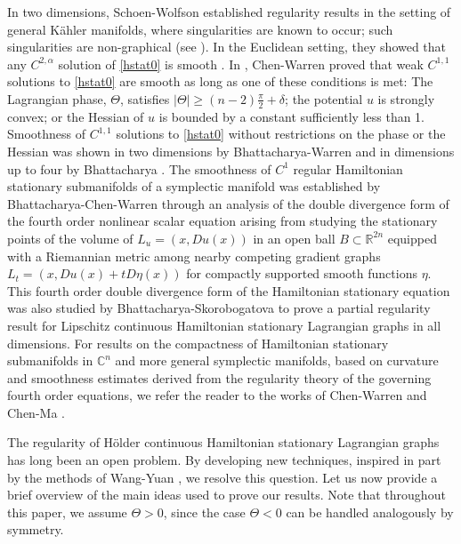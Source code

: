 \documentclass[12pt,reqno]{amsart}%
\theoremstyle{plain}
\numberwithin{equation}{section}
\theoremstyle{definition}
\theoremstyle{remark}
\begin{document}
In two dimensions, Schoen-Wolfson \cite{SW03} established regularity results in the setting of general Kähler manifolds, where singularities are known to occur; such singularities are non-graphical (see \cite[Section 7]{SWJDG}).
 In the Euclidean setting, they showed that any $C^{2,\alpha}$ solution of \eqref{hstat0} is smooth \cite[Proposition 4.6]{SWJDG}. In \cite{ChenWarren}, Chen-Warren proved that weak  $C^{1,1}$ solutions
to  \eqref{hstat0} are smooth as long as one of these conditions is met: The Lagrangian phase, $\Theta$, satisfies $|\Theta|\geq (n-2)\frac{\pi}{2}+\delta$; the potential $u$ is strongly convex; or the Hessian of $u$ is bounded by a constant sufficiently less than 1. Smoothness of $C^{1,1}$ solutions to \eqref{hstat0} without restrictions on the phase or the Hessian was shown in two dimensions by Bhattacharya-Warren \cite{BW2} and in dimensions up to four by Bhattacharya \cite{AB2025}. The smoothness of $C^1$ regular Hamiltonian stationary submanifolds of a symplectic manifold was established by Bhattacharya-Chen-Warren \cite{BCW} through an analysis of the double divergence form of the fourth order nonlinear scalar equation arising from studying the stationary points of
the volume of $L_u=(x,Du(x))$ in an open ball $B\subset\mathbb{R}^{2n}$ equipped
with a Riemannian metric among nearby competing gradient graphs $L_{t}=(x, Du(x)
+t D\eta(x))$ for compactly supported smooth functions $\eta$. This fourth order double divergence form of the Hamiltonian stationary equation was also studied by Bhattacharya-Skorobogatova \cite{BhaSko} to prove a partial regularity result for Lipschitz continuous Hamiltonian stationary Lagrangian graphs in all dimensions. For results on the compactness of Hamiltonian stationary submanifolds in $\mathbb{C}^n$ and more general symplectic manifolds, based on curvature and smoothness estimates derived from the regularity theory of the governing fourth order equations, we refer the reader to the works of Chen-Warren \cite{chen2024compactification} and Chen-Ma \cite{chen2024compactness}.

\medskip
The regularity of Hölder continuous Hamiltonian stationary Lagrangian graphs has long been an open problem. By developing new techniques, inspired in part by the methods of Wang-Yuan \cite{WangY}, we resolve this question. Let us now provide a brief overview of the main ideas used to prove our results. Note that throughout this paper, we assume $\Theta > 0$, since the case $\Theta < 0$ can be handled analogously by symmetry. 
\end{document}
